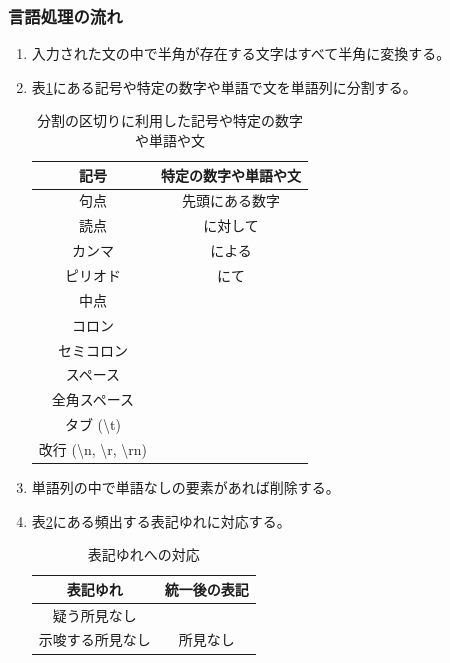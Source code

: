 \subsubsection{言語処理の流れ}
\begin{enumerate}
    \item 入力された文の中で半角が存在する文字はすべて半角に変換する。
    \item 表\ref{tb:nl1}にある記号や特定の数字や単語で文を単語列に分割する。
        \begin{table}[htbp]
            \caption[]{分割の区切りに利用した記号や特定の数字や単語や文}
            \label{tb:nl1}
            \centering
            \normalsize
            \begin{tabular}{c|c} \hline
                記号 & 特定の数字や単語や文 \\ \hline \hline
                句点 & 先頭にある数字 \\ \hline
                読点 & に対して \\ \hline
                カンマ & による \\ \hline
                ピリオド & にて \\ \hline
                中点 & \\ \hline
                コロン & \\ \hline
                セミコロン & \\ \hline
                スペース & \\ \hline
                全角スペース & \\ \hline
                タブ (\textbackslash t) & \\ \hline
                改行 (\textbackslash n, \textbackslash r, \textbackslash rn) & \\ \hline
            \end{tabular}
        \end{table}
    \item 単語列の中で単語なしの要素があれば削除する。
    \item 表\ref{tb:nl2}にある頻出する表記ゆれに対応する。
        \begin{table}[htbp]
            \caption[]{表記ゆれへの対応}
            \label{tb:nl2}
            \centering
            \normalsize
            \begin{tabular}{c|c} \hline
                表記ゆれ & 統一後の表記 \\ \hline \hline
                疑う所見なし & \\
                示唆する所見なし & 所見なし \\

\end{tabular}
\end{table}
\end{enumerate}
